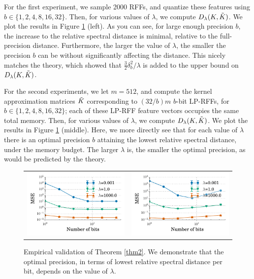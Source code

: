 For the first experiment, we sample 2000 RFFs, and quantize these features using $b \in \{1,2,4,8,16,32\}$.  Then, for various values of $\lambda$, we compute $D_{\lambda}(K,\tilde{K})$.  We plot the results in Figure \ref{fig:theo_validation} (left). As you can see, for large enough precision $b$, the increase to the relative spectral distance is minimal, relative to the full-precision distance. Furthermore, the larger the value of $\lambda$, the smaller the precision $b$ can be without significantly affecting the distance. This nicely matches the theory, which showed that $\frac{3}{2}\delta_b^2/\lambda$ is added to the upper bound on $D_{\lambda}(K,\tilde{K})$.

For the second experiments, we let $m = 512$, and compute the kernel approximation matrices $\tilde{K}$ corresponding to $(32/b)m$ $b$-bit LP-RFFs, for $b \in \{1,2,4,8,16,32\}$; each of these LP-RFF feature vectors occupies the same total memory. Then, for various values of $\lambda$, we compute $D_{\lambda}(K,\tilde{K})$. We plot the results in Figure \ref{fig:theo_validation} (middle). Here, we more directly see that for each value of $\lambda$ there is an optimal precision $b$ attaining the lowest relative spectral distance, under the memory budget.  The larger $\lambda$ is, the smaller the optimal precision, as would be predicted by the theory.

\begin{figure}
	\centering
	\begin{tabular}{c c}
		\includegraphics[width=0.4\linewidth]{figures/theory_fixed_n_feat.pdf} &
		\includegraphics[width=0.4\linewidth]{figures/theory_fixed_memory.pdf} 
	\end{tabular}
	\caption{Empirical validation of Theorem \ref{thm2}.  We demonstrate that the optimal precision, in terms of lowest relative spectral distance per bit, depends on the value of $\lambda$.}
	\label{fig:theo_validation}
\end{figure}

